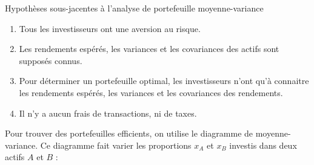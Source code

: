 \documentclass[10pt, french]{article}
\begin{document}
\begin{multicols*}{2}
\begin{conceptgen}{Hypothèses sous-jacentes à l'analyse de portefeuille moyenne-variance}
\begin{enumerate}
	\item	Tous les investisseurs ont une aversion au risque.
	\item	Les rendements espérés, les variances et les covariances des actifs sont supposés connus.
	\item	Pour déterminer un portefeuille optimal, les investisseurs n'ont qu'à connaitre les rendements espérés, les variances et les covariances des rendements.
	\item	Il n'y a aucun frais de transactions, ni de taxes.
\end{enumerate}
\end{conceptgen}

Pour trouver des portefeuilles efficients, on utilise le diagramme de moyenne-variance. Ce diagramme fait varier les proportions $x_{A}$ et $x_{B}$ investis dans deux actifs $A$ et $B$ :
\begin{center}


\begin{tikzpicture}[x=0.75pt,y=0.75pt,yscale=-1,xscale=1]


\end{tikzpicture}
\end{center}
\end{multicols*}
\end{document}
